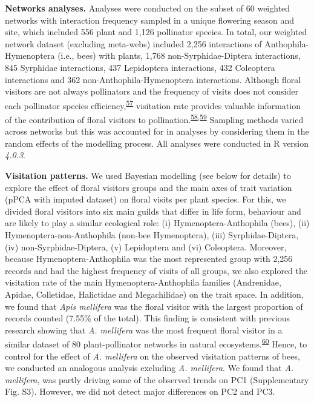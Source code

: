 \documentclass[
  12pt,
  a4paper,
]{article}
\begin{document}
\textbf{Networks analyses.} Analyses were conducted on the subset of 60 weighted networks with interaction frequency sampled in a unique flowering season and site, which included 556 plant and 1,126 pollinator species. In total, our weighted network dataset (excluding meta-webs) included 2,256 interactions of Anthophila-Hymenoptera (i.e., bees) with plants, 1,768 non-Syrphidae-Diptera interactions, 845 Syrphidae interactions, 437 Lepidoptera interactions, 432 Coleoptera interactions and 362 non-Anthophila-Hymenoptera interactions. Although floral visitors are not always pollinators and the frequency of visits does not consider each pollinator species efficiency,\textsuperscript{\protect\hyperlink{ref-ballantyne2015}{57}} visitation rate provides valuable information of the contribution of floral visitors to pollination.\textsuperscript{\protect\hyperlink{ref-vazquez2005}{58},\protect\hyperlink{ref-vazquez2012}{59}} Sampling methods varied across networks but this was accounted for in analyses by considering them in the random effects of the modelling process. All analyses were conducted in R version \emph{4.0.3}.

\textbf{Visitation patterns.} We used Bayesian modelling (see below for details) to explore the effect of floral visitors groups and the main axes of trait variation (pPCA with imputed dataset) on floral visits per plant species. For this, we divided floral visitors into six main guilds that differ in life form, behaviour and are likely to play a similar ecological role: (i) Hymenoptera-Anthophila (bees), (ii) Hymenoptera-non-Anthophila (non-bee Hymenoptera), (iii) Syrphidae-Diptera, (iv) non-Syrphidae-Diptera, (v) Lepidoptera and (vi) Coleoptera. Moreover, because Hymenoptera-Anthophila was the most represented group with 2,256 records and had the highest frequency of visits of all groups, we also explored the visitation rate of the main Hymenoptera-Anthophila families (Andrenidae, Apidae, Colletidae, Halictidae and Megachilidae) on the trait space. In addition, we found that \emph{Apis mellifera} was the floral visitor with the largest proportion of records counted (7.55\% of the total). This finding is consistent with previous research showing that \emph{A. mellifera} was the most frequent floral visitor in a similar dataset of 80 plant-pollinator networks in natural ecosystems.\textsuperscript{\protect\hyperlink{ref-hung2018}{60}} Hence, to control for the effect of \emph{A. mellifera} on the observed visitation patterns of bees, we conducted an analogous analysis excluding \emph{A. mellifera}. We found that \emph{A. mellifera}, was partly driving some of the observed trends on PC1 (Supplementary Fig. S3). However, we did not detect major differences on PC2 and PC3.
\end{document}
